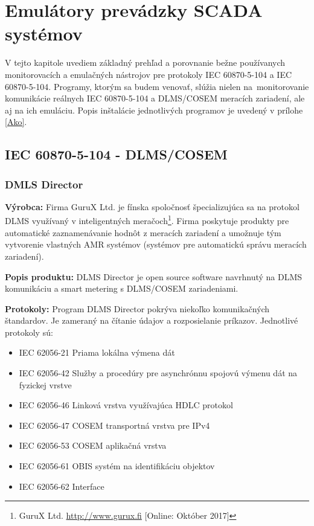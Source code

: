 \chapter{Emulátory prevádzky SCADA systémov}
\label{porovnanie}
\tab V tejto kapitole uvediem základný prehľad a porovnanie bežne používanych monitorovacích a emulačných nástrojov pre protokoly IEC 60870-5-104 a IEC 60870-5-104. Programy, ktorým sa budem venovať, slúžia nielen na~monitorovanie komunikácie reálnych IEC 60870-5-104 a DLMS/COSEM meracích zariadení, ale aj na ich emuláciu. Popis inštalácie jednotlivých programov je uvedený v prílohe \ref{Ako}.
\section{IEC 60870-5-104 - DLMS/COSEM}
\subsection{DMLS Director}
\textbf{Výrobca:} Firma GuruX Ltd. je fínska spoločnosť špecializujúca sa na protokol DLMS využívaný v inteligentných meračoch\footnote{GuruX Ltd. \url{http://www.gurux.fi} [Online: Október 2017]}. Firma poskytuje produkty pre automatické zaznamenávanie hodnôt z meracích zariadení a umožnuje tým vytvorenie vlastných AMR systémov (systémov pre automatickú správu meracích zariadení). \par
\noindent \textbf{Popis produktu:} DLMS Director je open source software navrhnutý na DLMS komunikáciu a smart metering s DLMS/COSEM zariadeniami. \par 
\noindent \textbf{Protokoly:} Program DLMS Director pokrýva niekoľko komunikačných štandardov. Je zameraný na čítanie údajov a rozposielanie príkazov. Jednotlivé protokoly sú: 
\begin{itemize}
\item IEC 62056-21 Priama lokálna výmena dát
\item IEC 62056-42 Služby a procedúry pre asynchrónnu spojovú výmenu dát na fyzickej vrstve
\item IEC 62056-46 Linková vrstva využívajúca HDLC protokol
\item IEC 62056-47 COSEM transportná vrstva pre IPv4
\item IEC 62056-53 COSEM aplikačná vrstva
\item IEC 62056-61 OBIS systém na identifikáciu objektov
\item IEC 62056-62 Interface
\end{itemize} \par

